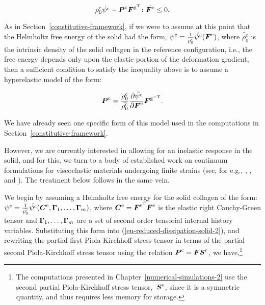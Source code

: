 \begin{equation}
\rho_{0}^{\mathrm{c}} \dot{\psi^{\mathrm{c}}} - \mbox{\boldmath$ P$}^{\mathrm{c}}
\mbox{\boldmath$ F$}^{\mathrm{g}^{\mathrm{T}}} \colon \dot{\mbox{\boldmath$ F$}^{\mathrm{e}}} \leq 0.
\label{eu-reduced-dissipation-solid-2}
\end{equation}

As in Section~\ref{constitutive-framework}, if we were to assume at
this point that the Helmholtz free energy of the solid had the form,
$\psi^{\mathrm{c}} = \frac{1}{\tilde{\rho_{0}^{\mathrm{c}}}}
\hat{\psi^{\mathrm{c}}} (\mbox{\boldmath$ F$}^{\mathrm{e}})$, where
$\tilde{\rho_{0}^{\mathrm{c}}}$ is the intrinsic density of the solid
collagen in the reference configuration, i.e., the free energy depends
only upon the elastic portion of the deformation gradient, then a
sufficient condition to satisfy the inequality above is to assume a
hyperelastic model of the form:

\begin{equation}
\mbox{\boldmath$ P$}^{\mathrm{c}} =
\frac{\rho_{0}^{\mathrm{c}}}{\tilde{\rho_{0}^{\mathrm{c}}}}
\frac{\partial \hat{\psi^{\mathrm{c}}}}{\partial \mbox{\boldmath$ F$}^{\mathrm{e}}}
\mbox{\boldmath$ F$}^{\mathrm{g}^{\mathrm{-T}}}.
\label{eu-solid-hyperelastic}
\end{equation}

\noindent We have already seen one specific form of this model used in
the computations in Section~\ref{constitutive-framework}.

However, we are currently interested in allowing for an inelastic
response in the solid, and for this, we turn to a body of established
work on continuum formulations for viscoelastic materials undergoing
finite strains (see, for e.g., \citet{simo86}, \citet{holzapfel96},
and \citet{SimoHughes:98}). The treatment below follows in the same
vein.

We begin by assuming a Helmholtz free energy for the solid collagen of
the form: $\psi^{\mathrm{c}} = \frac{1}{\tilde{\rho_{0}^{\mathrm{c}}}}
\hat{\psi^{\mathrm{c}}} (\mbox{\boldmath$ C$}^{\mathrm{e}}, \mbox{\boldmath$\Gamma$}_{1}, \ldots,
\mbox{\boldmath$\Gamma$}_{m})$, where $\mbox{\boldmath$ C$}^{\mathrm{e}}= \mbox{\boldmath$ F$}^{\mathrm{e}^{\mathrm{T}}}
\mbox{\boldmath$ F$}^{\mathrm{e}}$ is the elastic right Cauchy-Green tensor and
$\mbox{\boldmath$\Gamma$}_{1}, \ldots, \mbox{\boldmath$\Gamma$}_{m}$ are a set of second order tensorial
internal history variables. Substituting this form into
(\ref{eu-reduced-dissipation-solid-2}), and rewriting the partial
first Piola-Kirchhoff stress tensor in terms of the partial second
Piola-Kirchhoff stress tensor using the relation $\mbox{\boldmath$ P$}^{\mathrm{c}} =
\mbox{\boldmath$ F$} \mbox{\boldmath$ S$}^{\mathrm{c}}$, we have,\footnote{The computations presented in
  Chapter~\ref{numerical-simulations-2} use the second partial
  Piola-Kirchhoff stress tensor,~$\mbox{\boldmath$ S$}^{\mathrm{c}}$, since it is a
  symmetric quantity, and thus requires less memory for storage.}

